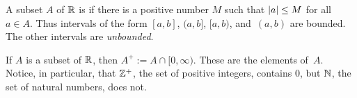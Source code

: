 A subset $A$ of $\mathbb{R}$ is
 if there is a positive number $M$ such that $\lvert a\rvert \le M$ for all $a \in A$.
Thus intervals of the form $[a,b]$, $(a,b]$, $[a,b)$, and~$(a,b)$ are
bounded.  The other intervals are \emph{unbounded}.

If $A$ is a subset of $\mathbb{R}$, then
$A^+ := A \cap [0,\infty)$.  These are the
 elements of~$A$.  Notice, in particular, that $\mathbb{Z}^+$, the set of positive integers,
contains $0$, but $\mathbb{N}$, the set of natural numbers, does not.

 \endinput
